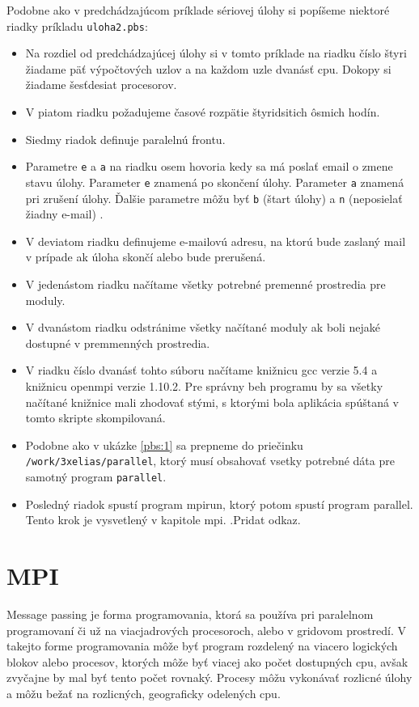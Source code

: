 Podobne ako v predchádzajúcom príklade sériovej úlohy si popíšeme niektoré riadky príkladu \texttt{uloha2.pbs}:
\begin{itemize}
\item
  Na rozdiel od predchádzajúcej úlohy si v tomto príklade na riadku číslo štyri žiadame päť výpočtových uzlov a na každom uzle dvanásť \acrshort{cpu}.
  Dokopy si žiadame šesťdesiat procesorov.
\item
  V piatom riadku požadujeme časové rozpätie štyridsitich ôsmich hodín.
\item
  Siedmy riadok definuje paralelnú frontu.
\item
  Parametre \texttt{e} a \texttt{a} na riadku osem hovoria kedy sa má poslať email o zmene stavu úlohy.
  Parameter \texttt{e} znamená po skončení úlohy.
  Parameter \texttt{a} znamená pri zrušení úlohy.
  Ďalšie parametre môžu byť \texttt{b} (štart úlohy) a \texttt{n} (neposielať žiadny e-mail) \cite{cmd:qsub}.
\item
  V deviatom riadku definujeme e-mailovú adresu, na ktorú bude zaslaný mail v prípade ak úloha skončí alebo bude prerušená.
\item
  V jedenástom riadku načítame všetky potrebné premenné prostredia pre moduly.
\item
  V dvanástom riadku odstránime všetky načítané moduly ak boli nejaké dostupné v premmenných prostredia.
\item
  V riadku číslo dvanásť tohto súboru načítame knižnicu gcc verzie 5.4 a knižnicu openmpi verzie 1.10.2.
  Pre správny beh programu by sa všetky načítané knižnice mali zhodovať stými, s ktorými bola aplikácia spúštaná v tomto skripte skompilovaná.
\item
  Podobne ako v ukázke \ref{pbs:1} sa prepneme do priečinku \texttt{/work/3xelias/parallel}, ktorý musí obsahovať vsetky potrebné dáta
  pre samotný program \texttt{parallel}.
\item
  Posledný riadok spustí program mpirun, ktorý potom spustí program parallel. Tento krok je vysvetlený v kapitole mpi. .Pridat odkaz.
\end{itemize}

\section{MPI}
Message passing je forma programovania, ktorá sa používa pri paralelnom programovaní či už na viacjadrových procesoroch, alebo v gridovom prostredí.
V takejto forme programovania môže byť program rozdelený na viacero logických blokov alebo procesov,
ktorých môže byť viacej ako počet dostupných \acrshort{cpu}, avšak zvyčajne by mal byť tento počet rovnaký.
Procesy môžu vykonávať rozlicné úlohy a môžu bežať na rozlicných, geograficky odelených \acrshort{cpu}.

